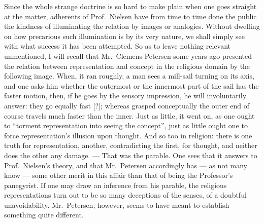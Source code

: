 \documentclass[12pt,a4paper]{book}
\newcommand{\opage}[1]{\marginnote{\footnotesize\textit{[#1]}}}
\begin{document}
Since the whole strange doctrine is so hard to make plain when one goes
straight at the matter, adherents of Prof.\ Nielsen have from time to time done
the public the kindness of illuminating the relation by images or analogies.
Without dwelling on how precarious such illumination is by its very nature, we
shall simply see with what success it has been attempted. So as to leave
nothing relevant unmentioned, I will recall that Mr.\ Clemens Petersen some
years ago presented the relation between representation and concept in the
religious
\opage{38}domain by the following image. When, it ran roughly, a man sees a
mill-sail turning on its axis, and one asks him whether the outermost or the
innermost part of the sail has the faster motion, then, if he goes by the
sensory impression, he will involuntarily answer: they go equally fast [?];
whereas grasped conceptually the outer end of course travels much faster than
the inner. Just as little, it went on, as one ought to ``torment representation
into seeing the concept'', just as little ought one to force representation's
illusion upon thought. And so too in religion: there is one truth for
representation, another, contradicting the first, for thought, and neither does
the other any damage. --- That was the parable. One sees that it answers to
Prof.\ Nielsen's theory, and that Mr.\ Petersen accordingly has --- as not many
know --- some other merit in this affair than that of being the Professor's
panegyrist. If one may draw an inference from his parable, the religious
representations turn out to be so many deceptions of the senses, of a doubtful
unavoidability. Mr.\ Petersen, however, seems to have meant to establish
something quite different.
\end{document}
